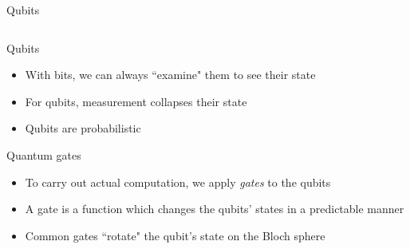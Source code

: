 \documentclass[14pt]{beamer}
\begin{document}
\begin{frame}{Qubits}
\begin{columns}[T]
\begin{column}{.4\textwidth}
\begin{block}{}
		\end{block}
	\end{column}
\end{columns}
\end{frame}

\begin{frame}{Qubits}
\begin{itemize}
	\item With bits, we can always ``examine" them to see their state
	\item For qubits, measurement collapses their state
	\item Qubits are probabilistic 
\end{itemize}
\end{frame}

\begin{frame}{Quantum gates}
\begin{itemize}
	\item To carry out actual computation, we apply \textit{gates} to the qubits
  	\item A gate is a function which changes the qubits' states in a predictable manner
  	\item Common gates ``rotate" the qubit's state on the Bloch sphere
\end{itemize}
\end{frame}
\end{document}
